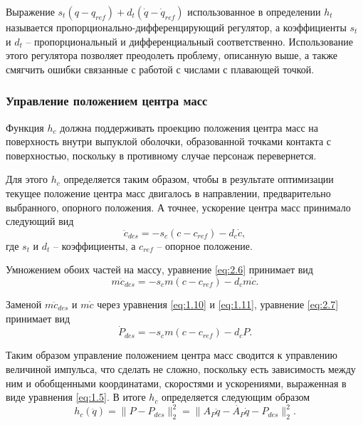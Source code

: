 Выражение $s_{t} (q - q_{ref}) + d_{t} (\dot{q} - \dot{q}_{ref})$ использованное в определении $h_{t}$ называется \break пропорционально-дифференцирующий регулятор, а коэффициенты $s_{t}$ и $d_{t}$ -- пропорциональный и дифференциальный соответственно. Использование этого регулятора позволяет преодолеть проблему, описанную выше, а также смягчить ошибки связанные с работой с числами с плавающей точкой.


\subsubsection{Управление положением центра масс}

Функция $h_{c}$ должна поддерживать проекцию положения центра масс на поверхность внутри выпуклой оболочки, образованной точками контакта с поверхностью, поскольку в противному случае персонаж перевернется.

Для этого $h_{c}$ определяется таким образом, чтобы в результате оптимизации текущее положение центра масс двигалось в направлении, предварительно выбранного, опорного положения. А точнее, ускорение центра масс принимало следующий вид
\begin{equation*}
  \ddot{c}_{des} = - s_{c} (c - c_{ref}) - d_{c} \dot{c}, \tag{2.6}\label{eq:2.6}
\end{equation*}
где $s_{t}$ и $d_{t}$ -- коэффициенты, а $c_{ref}$ -- опорное положение.

Умножением обоих частей на массу, уравнение \ref{eq:2.6} принимает вид
\begin{equation*}
  m \ddot{c}_{des} = - s_{c} m (c - c_{ref}) - d_{c} m \dot{c}. \tag{2.7}\label{eq:2.7}
\end{equation*}

Заменой $m \ddot{c}_{des}$ и $m \dot{c}$ через уравнения \ref{eq:1.10} и \ref{eq:1.11}, уравнение \ref{eq:2.7} принимает вид
\begin{equation*}
  \dot{P}_{des} = - s_{c} m (c - c_{ref}) - d_{c} P. \tag{2.8}\label{eq:2.8}
\end{equation*}

Таким образом управление положением центра масс сводится к управлению величиной импульса, что сделать не сложно, поскольку есть зависимость между ним и обобщенными координатами, скоростями и ускорениями, выраженная в виде уравнения \ref{eq:1.5}. В итоге $h_{c}$ определяется следующим образом
\begin{equation*}
  h_{c}(\ddot{q}) = \lVert P - P_{des} \rVert_{2}^{2} = \lVert A_{P}\ddot{q} - \dot{A_{P}} \dot{q} - P_{des} \rVert_{2}^{2}.
\end{equation*}

